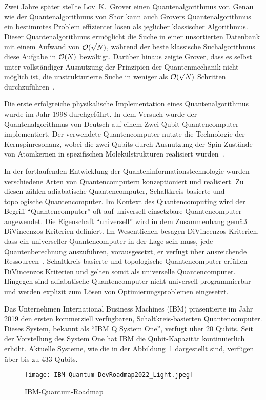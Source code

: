 Zwei Jahre später stellte Lov~K.~Grover einen Quantenalgorithmus vor.
Genau wie der Quantenalgorithmus von Shor kann auch Grovers Quantenalgorithmus ein bestimmtes Problem effizienter lösen als jeglicher klassischer Algorithmus.
Dieser Quantenalgorithmus ermöglicht die Suche in einer unsortierten Datenbank mit einem Aufwand von \(\operatorname{\mathcal{O}}(\sqrt N)\), 
während der beste klassische Suchalgorithmus diese Aufgabe in \(\operatorname{\mathcal{O}}(N)\) bewältigt. 
Darüber hinaus zeigte Grover, 
dass es selbst unter vollständiger Ausnutzung der Prinzipien der Quantenmechanik nicht möglich ist, 
die unstrukturierte Suche in weniger als \(\operatorname{\mathcal{O}}(\sqrt N)\) Schritten durchzuführen~\cite{grover1996fast}.

Die erste erfolgreiche physikalische Implementation eines Quantenalgorithmus wurde im Jahr 1998 durchgeführt.
In dem Versuch wurde der Quantenalgorithmus von Deutsch auf einem Zwei-Qubit-Quantencomputer implementiert.
Der verwendete Quantencomputer nutzte die Technologie der Kernspinresonanz, 
wobei die zwei Qubits durch Ausnutzung der Spin-Zustände von Atomkernen in spezifischen Molekülstrukturen realisiert wurden~\cite{Jones_1998}.

In der fortlaufenden Entwicklung der Quanteninformationstechnologie wurden verschiedene Arten von Quantencomputern konzeptioniert und realisiert.
Zu diesen zählen adiabatische Quantencomputer, Schaltkreis-basierte und topologische Quantencomputer.
Im Kontext des Quantencomputing wird der Begriff "`Quantencomputer"' oft auf universell einsetzbare Quantencomputer angewendet.
Die Eigenschaft "`universell"' wird in dem Zusammenhang gemäß DiVincenzos Kriterien definiert. 
Im Wesentlichen besagen DiVincenzos Kriterien, dass ein universeller Quantencomputer in der Lage sein muss, jede Quantenberechnung auszuführen, vorausgesetzt, er verfügt über ausreichende Ressourcen~\cite{DiVincenzo_2000}.
Schaltkreis-basierte und topologische Quantencomputer erfüllen DiVincenzos Kriterien und gelten somit als universelle Quantencomputer.
Hingegen sind adiabatische Quantencomputer nicht universell programmierbar und werden explizit zum Lösen von Optimierungsproblemen eingesetzt.

Das Unternehmen International Business Machines (IBM) präsentierte im Jahr 2019 den ersten kommerziell verfügbaren, Schaltkreis-basierten Quantencomputer.
Dieses System, bekannt als "`IBM Q System One"', verfügt über 20 Qubits.
Seit der Vorstellung des System One hat IBM die Qubit-Kapazität kontinuierlich erhöht. 
Aktuelle Systeme, wie die in der Abbildung~\ref{fig:IBM-Quantum-DevRoadmap2022} dargestellt sind, verfügen über bis zu 433 Qubits.
\begin{figure}[H]
    \centering
    \texttt{[image: IBM-Quantum-DevRoadmap2022\_Light.jpeg]}
    \caption{IBM-Quantum-Roadmap~\cite{IBM_2023}}
    \label{fig:IBM-Quantum-DevRoadmap2022}
\end{figure}


